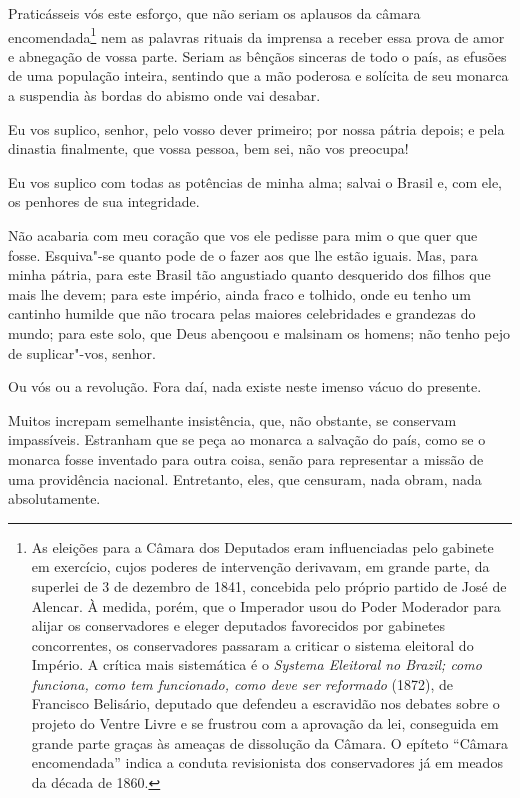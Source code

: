  Praticásseis vós este esforço, que não seriam os aplausos da câmara
encomendada\footnote{ As eleições para a Câmara dos Deputados eram influenciadas pelo gabinete
em exercício, cujos poderes de intervenção derivavam, em grande parte,
da superlei de 3 de dezembro de 1841, concebida pelo próprio partido de
José de Alencar. À medida, porém, que o Imperador usou do Poder
Moderador para alijar os conservadores e eleger deputados favorecidos
por gabinetes concorrentes, os conservadores passaram a criticar o
sistema eleitoral do Império. A crítica mais sistemática é o
\textit{Systema Eleitoral no Brazil; como funciona, como tem
funcionado, como deve ser reformado} (1872), de Francisco Belisário,
deputado que defendeu a escravidão nos debates sobre o projeto do
Ventre Livre e se frustrou com a aprovação da lei, conseguida em grande
parte graças às ameaças de dissolução da Câmara. O epíteto ``Câmara
encomendada'' indica a conduta revisionista dos conservadores já em
meados da década de 1860.} nem as palavras rituais da imprensa a receber essa prova de amor e
abnegação de vossa parte. Seriam as bênçãos sinceras de todo o país, as
efusões de uma população inteira, sentindo que a mão poderosa e
solícita de seu monarca a suspendia às bordas do abismo onde vai desabar. 

 Eu vos suplico, senhor, pelo vosso dever primeiro; por nossa pátria
depois; e pela dinastia finalmente, que vossa pessoa, bem sei, não vos preocupa!

 Eu vos suplico com todas as potências de minha alma; salvai o Brasil e,
com ele, os penhores de sua integridade.

 Não acabaria com meu coração que vos ele pedisse para mim o que quer
que fosse. Esquiva"-se quanto pode de o fazer aos que lhe estão
iguais. Mas, para minha pátria, para este Brasil tão angustiado quanto
desquerido dos filhos que mais lhe devem; para este império, ainda
fraco e tolhido, onde eu tenho um cantinho humilde que não trocara
pelas maiores celebridades e grandezas do mundo; para este solo, que
Deus abençoou e malsinam os homens; não tenho pejo de suplicar"-vos, senhor. 

 Ou vós ou a revolução. Fora daí, nada existe neste imenso vácuo do presente. 

 Muitos increpam semelhante insistência, que, não obstante, se conservam
impassíveis. Estranham que se peça ao monarca a salvação do país, como
se o monarca fosse inventado para outra coisa, senão para representar a
missão de uma providência nacional. Entretanto, eles, que censuram,
nada obram, nada absolutamente.


